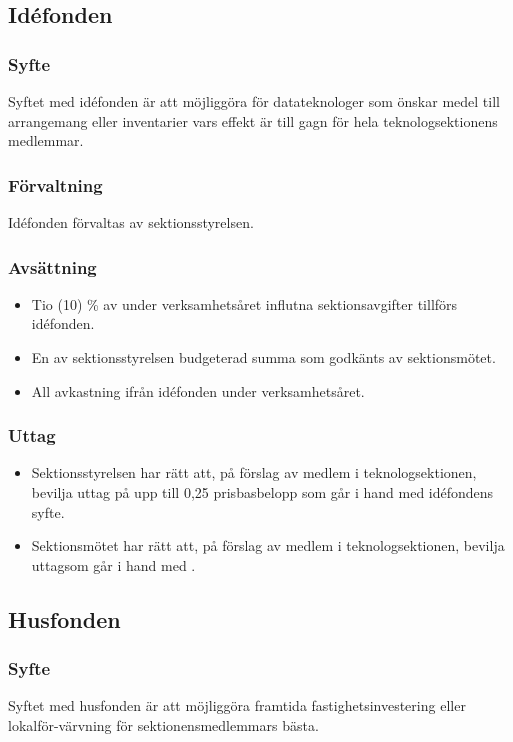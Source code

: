 \documentclass[a4paper]{dtek}
\begin{document}
\subsection{Idéfonden}
\subsubsection{Syfte}
\label{sec:idefond_syfte}
Syftet med idéfonden är att möjliggöra för datateknologer som önskar medel till arrangemang eller inventarier vars effekt är till gagn för hela teknologsektionens medlemmar.
\subsubsection{Förvaltning}
Idéfonden förvaltas av sektionsstyrelsen.
\subsubsection{Avsättning}
\begin{itemize}
\item Tio (10) \% av under verksamhetsåret influtna sektionsavgifter tillförs idéfonden.
\item En av sektionsstyrelsen budgeterad summa som godkänts av sektionsmötet.
\item All avkastning ifrån idéfonden under verksamhetsåret.
\end{itemize}
\subsubsection{Uttag}
\begin{itemize}
  \item Sektionsstyrelsen har rätt att, på förslag av medlem i teknologsektionen, bevilja uttag på upp till 0,25 prisbasbelopp som går i hand med idéfondens syfte.
  \item Sektionsmötet har rätt att, på förslag av medlem i teknologsektionen, bevilja uttagsom går i hand med .
\end{itemize}

\subsection{Husfonden}
\subsubsection{Syfte}
\label{sec:husfond_syfte}
Syftet med husfonden är att möjliggöra framtida fastighetsinvestering eller lokalför-värvning för sektionensmedlemmars bästa.
\end{document}
